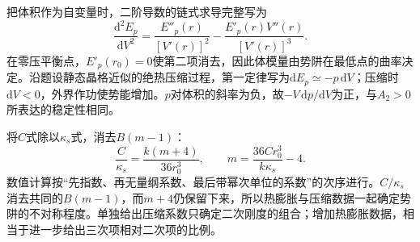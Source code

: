 \documentclass[UTF8,fontset=fandol,a4paper,11pt]{ctexart}
\begin{document}
把体积作为自变量时，二阶导数的链式求导完整写为
\[
\frac{\mathrm d^2E_p}{\mathrm dV^2}
=\frac{E''_p(r)}{[V'(r)]^2}
-\frac{E'_p(r)V''(r)}{[V'(r)]^3}.
\]
在零压平衡点，$E'_p(r_0)=0$使第二项消去，因此体模量由势阱在最低点的曲率决定。沿题设静态晶格近似的绝热压缩过程，第一定律写为$\mathrm dE_p\simeq-p\,\mathrm dV$；压缩时$\mathrm dV<0$，外界作功使势能增加。$p$对体积的斜率为负，故$-V\,\mathrm dp/\mathrm dV$为正，与$A_2>0$所表达的稳定性相同。

将$C$式除以$\kappa_s$式，消去$B(m-1)$：
\[
\frac C{\kappa_s}=\frac{k(m+4)}{36r_0^3},
\qquad
\boxed{m=\frac{36Cr_0^3}{k\kappa_s}-4}.
\]
数值计算按“先指数、再无量纲系数、最后带幂次单位的系数”的次序进行。$C/\kappa_s$消去共同的$B(m-1)$，而$m+4$仍保留下来，所以热膨胀与压缩数据一起确定势阱的不对称程度。单独给出压缩系数只确定二次刚度的组合；增加热膨胀数据，相当于进一步给出三次项相对二次项的比例。
\end{document}
